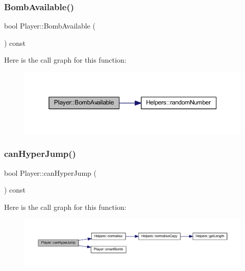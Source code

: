 \subsubsection{\texorpdfstring{Bomb\+Available()}{BombAvailable()}}
{\footnotesize\ttfamily bool Player\+::\+Bomb\+Available (\begin{DoxyParamCaption}{ }\end{DoxyParamCaption}) const}

Here is the call graph for this function\+:
\nopagebreak
\begin{figure}[H]
\begin{center}
\leavevmode
\includegraphics[width=350pt]{class_player_a19c3b63145b64941430d4362d2a32129_cgraph}
\end{center}
\end{figure}
\mbox{\label{class_player_a4b862816fdb015fa1c399d28d3620088}} 
\subsubsection{\texorpdfstring{can\+Hyper\+Jump()}{canHyperJump()}}
{\footnotesize\ttfamily bool Player\+::can\+Hyper\+Jump (\begin{DoxyParamCaption}{ }\end{DoxyParamCaption}) const}

Here is the call graph for this function\+:
\nopagebreak
\begin{figure}[H]
\begin{center}
\leavevmode
\includegraphics[width=350pt]{class_player_a4b862816fdb015fa1c399d28d3620088_cgraph}
\end{center}
\end{figure}
\mbox{\label{class_player_a669d12e0034e51489a37268b2ca7aab0}} 
